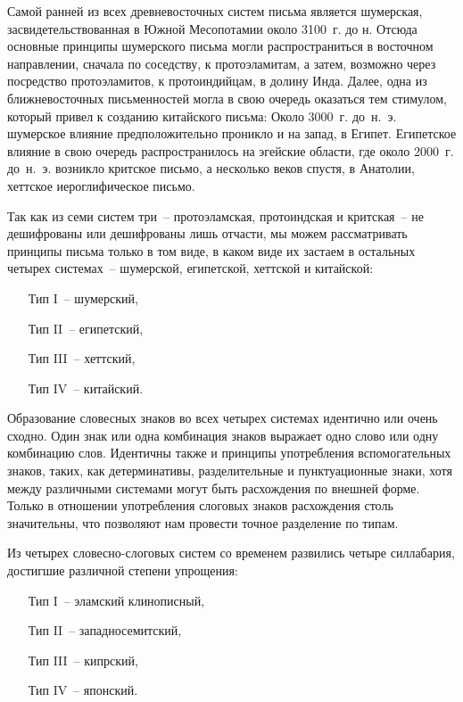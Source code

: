   Самой ранней из всех древневосточных систем письма является шумерская,
  засвидетельствованная в Южной Месопотамии около 3100~г. до н. Отсюда основные
  принципы шумерского письма могли распространиться в восточном направлении,
  сначала по соседству, к протоэламитам, а затем, возможно через посредство
  протоэламитов, к протоиндийцам, в долину Инда. Далее, одна из ближневосточных
  письменностей могла в свою очередь оказаться тем стимулом, который привел к
  созданию китайского письма: Около 3000~г. до~н.~э. шумерское влияние
  предположительно проникло и на запад, в Египет. Египетское влияние в свою
  очередь распространилось на эгейские области, где около 2000~г. до~н.~э.
  возникло критское письмо, а несколько веков спустя, в Анатолии, хеттское
  иероглифическое письмо.
  
  Так как из семи систем три~-- протоэламская, протоиндская и критская~-- не
  дешифрованы или дешифрованы лишь отчасти, мы можем рассматривать принципы
  письма только в том виде, в каком виде их застаем в остальных четырех
  системах~-- шумерской, египетской, хеттской и китайской:
  
  \begin{itemize}
    \item[Тип I~--]   шумерский,
    \item[Тип II~--]  египетский,  
    \item[Тип III~--] хеттский,
    \item[Тип IV~--]  китайский.
  \end{itemize}
  
  Образование словесных знаков во всех четырех системах идентично или очень
  сходно. Один знак или одна комбинация знаков выражает одно слово или одну
  комбинацию слов. Идентичны также и принципы употребления вспомогательных
  знаков, таких, как детерминативы, разделительные и пунктуационные знаки, хотя
  между различными системами могут быть расхождения по внешней форме. Только в
  отношении употребления слоговых знаков расхождения столь значительны, что
  позволяют нам провести точное разделение по типам.
  
  Из четырех словесно-слоговых систем со временем развились четыре силлабария,
  достигшие различной степени упрощения:  
  \begin{itemize}
    \item[Тип I~--]   эламский клинописный,
    \item[Тип II~--]  западносемитский,
    \item[Тип III~--] кипрский,
    \item[Тип IV~--]  японский.
  \end{itemize}
  
